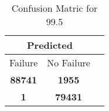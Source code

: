 \begin{table}[] 
\caption{Confusion Matric for 99.5} 
\label{Table: Prediction Accuracy-DMD99.5OnlySunEKF-combinationReflectionEKF-top2-Reflection} 
\centering 
\begin{tabular} 
 {@{}ccc@{}} 
\toprule 
\multicolumn{2}{c}{\textbf{Predicted}}
 \\ \midrule 
\multicolumn{1}{|c|}{Failure} & 
\multicolumn{1}{c|}{No Failure}
 \\ \midrule 
\multicolumn{1}{|c|}{\color{green}\textbf{88741}} & 
\multicolumn{1}{c|}{\color{red}\textbf{1955}}
 \\ \midrule 
\multicolumn{1}{|c|}{\color{red}\textbf{1}} & 
\multicolumn{1}{c|}{\color{green}\textbf{79431}}
 \\ \bottomrule 
\end{tabular} 
\end{table} 
